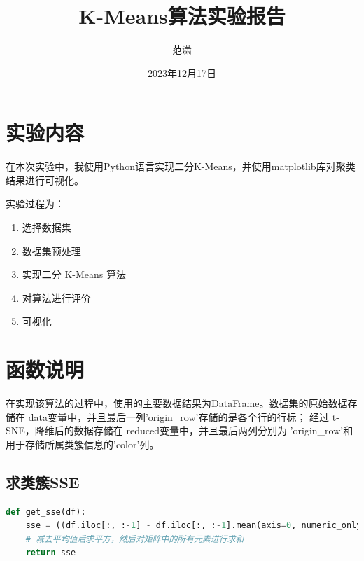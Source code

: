 \documentclass[a4paper,11pt]{article}%
\author{范潇}
\title{K-Means算法实验报告}
\date{2023年12月17日}
\theoremstyle{remark}
\theoremstyle{remark}
\theoremstyle{definition}
\theoremstyle{definition}
\theoremstyle{definition}
\begin{document}
\lstset{breaklines}%
		\lstset{extendedchars=false}%
\pagestyle{plain}
\maketitle
\section{实验内容}
在本次实验中，我使用Python语言实现二分K-Means，并使用matplotlib库对聚类结果进行可视化。

实验过程为：
\begin{enumerate}
    \item 选择数据集
    \item 数据集预处理
    \item 实现二分 K-Means 算法
    \item 对算法进行评价
    \item 可视化
\end{enumerate}
\section{函数说明}
在实现该算法的过程中，使用的主要数据结果为DataFrame。数据集的原始数据存储在 data变量中，并且最后一列'origin\_row'存储的是各个行的行标；
经过 t-SNE，降维后的数据存储在 reduced变量中，并且最后两列分别为 'origin\_row'和用于存储所属类簇信息的'color'列。
\subsection{求类簇SSE}
\begin{lstlisting}[language={Python},keywordstyle=\color{blue!70},commentstyle=\color{red!50!green!50!blue!50},frame=shadowbox,
    rulesepcolor=\color{red!20!green!20!blue!20}]
def get_sse(df):
    sse = ((df.iloc[:, :-1] - df.iloc[:, :-1].mean(axis=0, numeric_only=True)) ** 2).sum().sum()
    # 减去平均值后求平方，然后对矩阵中的所有元素进行求和
    return sse
\end{lstlisting}
\end{document}
